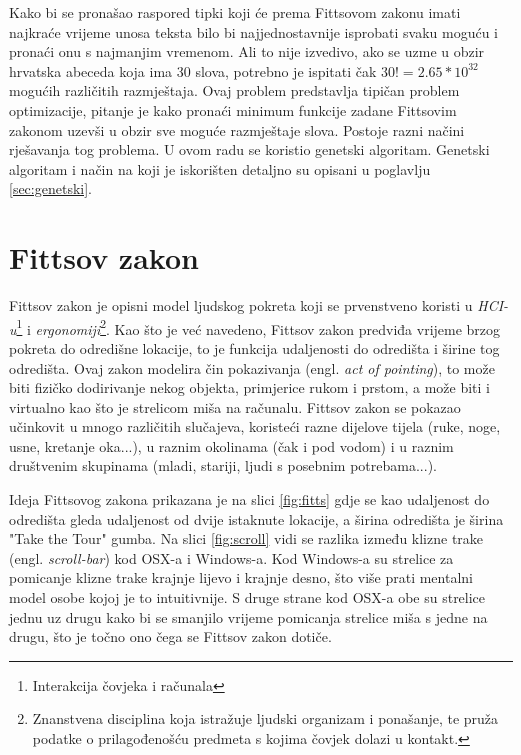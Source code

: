 \documentclass[times, utf8, zavrsni, numeric]{fer}
\begin{document}
Kako bi se pronašao raspored tipki koji će prema Fittsovom zakonu imati najkraće vrijeme unosa teksta bilo bi najjednostavnije isprobati svaku moguću i pronaći onu s najmanjim vremenom. Ali to nije izvedivo, ako se uzme u obzir hrvatska abeceda koja ima 30 slova, potrebno je ispitati čak $30! = 2.65*10^{32}$ mogućih različitih razmještaja. Ovaj problem predstavlja tipičan problem optimizacije, pitanje je kako pronaći minimum funkcije zadane Fittsovim zakonom uzevši u obzir sve moguće razmještaje slova. Postoje razni načini rješavanja tog problema. U ovom radu se koristio genetski algoritam. Genetski algoritam i način na koji je iskorišten detaljno su opisani u poglavlju \ref{sec:genetski}.

\section{Fittsov zakon}
\label{sec:fitts}
Fittsov zakon je opisni model ljudskog pokreta koji se prvenstveno koristi u \emph{HCI-u}\footnote{Interakcija čovjeka i računala } i \emph{ergonomiji}\footnote{Znanstvena disciplina koja istražuje ljudski organizam i ponašanje, te pruža podatke o prilagođenošću predmeta s kojima čovjek dolazi u kontakt.}. Kao što je već navedeno, Fittsov zakon predviđa vrijeme brzog pokreta do odredišne lokacije, to je funkcija udaljenosti do odredišta i širine tog odredišta. Ovaj zakon modelira čin pokazivanja (engl. \emph{act of pointing}), to može biti fizičko dodirivanje nekog objekta, primjerice rukom i prstom, a može biti i virtualno kao što je strelicom miša na računalu. Fittsov zakon se pokazao učinkovit u mnogo različitih slučajeva, koristeći razne dijelove tijela (ruke, noge, usne, kretanje oka...), u raznim okolinama (čak i pod vodom) i u raznim društvenim skupinama (mladi, stariji, ljudi s posebnim potrebama...). 

Ideja Fittsovog zakona prikazana je na slici \ref{fig:fitts} gdje se kao udaljenost do odredišta gleda udaljenost od dvije istaknute lokacije, a širina odredišta je širina "Take the Tour" gumba. Na slici \ref{fig:scroll} vidi se razlika između klizne trake (engl. \emph{scroll-bar}) kod OSX-a i Windows-a. Kod Windows-a su strelice za pomicanje klizne trake krajnje lijevo i krajnje desno, što više prati mentalni model osobe kojoj je to intuitivnije. S druge strane kod OSX-a obe su strelice jednu uz drugu kako bi se smanjilo vrijeme pomicanja strelice miša s jedne na drugu, što je točno ono čega se Fittsov zakon dotiče.
\end{document}
